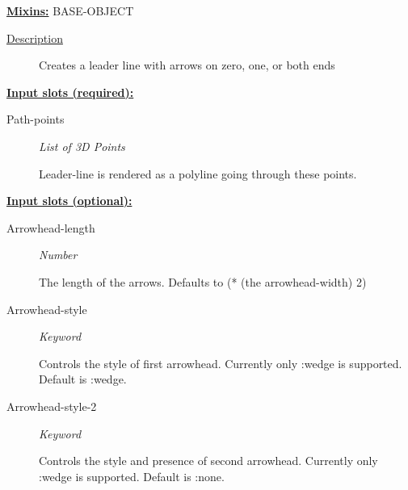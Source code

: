 \documentclass [11pt]{book}
\begin{document}
\begin{itemize}
\textbf{
\underline{Mixins:}} BASE-OBJECT





\begin{description}

\item [
\underline{Description}]


Creates a leader line with arrows on zero, one, or both ends



\end{description}








\textbf{
\underline{Input slots (required):}}

\begin{description}

\item [Path-points]
\emph{List of 3D Points}

 Leader-line is rendered as a polyline going through these points.




\end{description}






\textbf{
\underline{Input slots (optional):}}

\begin{description}

\item [Arrowhead-length]
\emph{Number}

 The length of the arrows. Defaults to (* (the arrowhead-width) 2)




\item [Arrowhead-style]
\emph{Keyword}

 Controls the style of first arrowhead. Currently only :wedge is supported. Default is :wedge.




\item [Arrowhead-style-2]
\emph{Keyword}

 Controls the style and presence of second arrowhead.
Currently only :wedge is supported. Default is :none.





\end{description}
\end{itemize}
\end{document}
